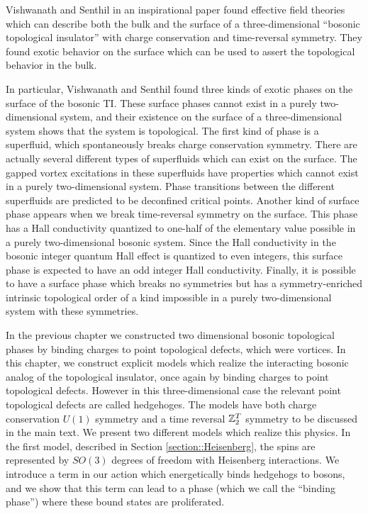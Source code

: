 Vishwanath and Senthil in an inspirational paper\cite{SenthilVishwanath} found effective field theories which can describe both the bulk and the surface of a three-dimensional ``bosonic topological insulator'' with charge conservation and time-reversal symmetry. They found exotic behavior on the surface which can be used to assert the topological behavior in the bulk.

In particular, Vishwanath and Senthil found three kinds of exotic phases on the surface of the bosonic TI. These surface phases cannot exist in a purely two-dimensional system, and their existence on the surface of a three-dimensional system shows that the system is topological. The first kind of phase is a superfluid, which spontaneously breaks charge conservation symmetry. There are actually several different types of superfluids which can exist on the surface. The gapped vortex excitations in these superfluids have properties which cannot exist in a purely two-dimensional system.  Phase transitions between the different superfluids are predicted to be deconfined critical points. Another kind of surface phase appears when we break time-reversal symmetry on the surface. This phase has a Hall conductivity quantized to one-half of the elementary value possible in a purely two-dimensional bosonic system. Since the Hall conductivity in the bosonic integer quantum Hall effect is quantized to even integers, this surface phase is expected to have an odd integer Hall conductivity. Finally, it is possible to have a surface phase which breaks no symmetries but has a symmetry-enriched intrinsic topological order of a kind impossible in a purely two-dimensional system with these symmetries.

In the previous chapter we constructed two dimensional bosonic topological phases by binding charges to point topological defects, which were vortices. 
In this chapter, we construct explicit models which realize the interacting bosonic analog of the topological insulator, once again by binding charges to point topological defects. However in this three-dimensional case the relevant point topological defects are called hedgehoges. 
The models have both charge conservation $U(1)$ symmetry and a time reversal $\mathbb{Z}_2^T$ symmetry to be discussed in the main text. We present two different models which realize this physics. In the first model, described in Section \ref{section::Heisenberg}, the spins are represented by $SO(3)$ degrees of freedom with Heisenberg interactions. We introduce a term in our action which energetically binds hedgehogs to bosons, and we show that this term can lead to a phase (which we call the ``binding phase'') where these bound states are proliferated.

